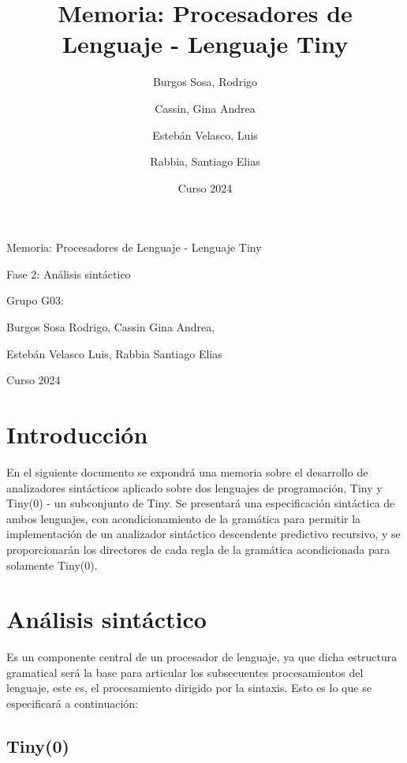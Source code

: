 \documentclass[11pt]{article}
\title{Memoria: Procesadores de Lenguaje - Lenguaje Tiny}
\author{Burgos Sosa, Rodrigo \and Cassin, Gina Andrea \and Estebán Velasco, Luis \and Rabbia, Santiago Elias}
\date{Curso 2024}
\begin{document}
\begin{titlepage}
    \centering
    {\Huge Memoria: Procesadores de Lenguaje - Lenguaje Tiny \par}
    \vspace{1cm}
    {\Large Fase 2: Análisis sintáctico \par}
    \vspace{2cm}
    {\Large Grupo G03: \par}
    {\Large Burgos Sosa Rodrigo, Cassin Gina Andrea, \par}
    {\Large Estebán Velasco Luis, Rabbia Santiago Elias \par}
    \vspace{2cm}
    {\Large Curso 2024 \par}
\end{titlepage}
\thispagestyle{empty}

    \newpage

    \section{Introducción}
        En el siguiente documento se expondrá una memoria sobre el desarrollo de analizadores sintácticos aplicado sobre dos lenguajes de programación, Tiny y Tiny(0) - un subconjunto de Tiny.
        Se presentará una especificación sintáctica de ambos lenguajes, con acondicionamiento de la gramática para permitir la implementación de un analizador
        sintáctico descendente predictivo recursivo, y se proporcionarán los directores de cada regla de la gramática acondicionada para solamente Tiny(0).

    \section{Análisis sintáctico}
        Es un componente central de un procesador de lenguaje, ya que dicha estructura gramatical será la base para articular los subsecuentes
        procesamientos del lenguaje, este es, el procesamiento dirigido por la sintaxis. Esto es lo que se especificará a continuación:
    
        \subsection{Tiny(0)}
\end{document}

